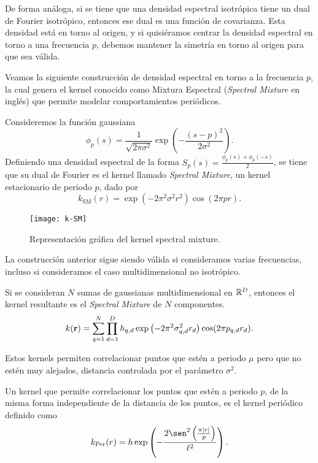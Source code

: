 De forma análoga, si se tiene que una densidad espectral isotrópica tiene un dual de Fourier isotrópico, entonces ese dual es una función de covarianza. Esta densidad está en torno al origen, y si quisiéramos centrar la densidad espectral en torno a una frecuencia \(p\), debemos mantener la simetría en torno al origen para que sea válida. 

Veamos la siguiente construcción de densidad espectral en torno a la frecuencia \(p\), la cual genera el kernel conocido como Mixtura Espectral (\emph{Spectral Mixture} en inglés) que permite modelar comportamientos periódicos.

\begin{proposition}
	Consideremos la función gaussiana
	\[\phi_{p}(s) = \frac{1}{\sqrt{2\pi \sigma^2}} \exp \left(-\frac{(s - p)^{2}}{2\sigma^{2}}\right).\] Definiendo una densidad espectral de la forma \(S_{p}(s) = \frac{\phi_{p}(s) + \phi_{p}(-s)}{2}\), se tiene que su dual de Fourier es el kernel llamado \emph{Spectral Mixture}, un kernel estacionario de periodo \(p\), dado por
	\[k_{\mathrm{SM}}(r) = \exp \left(-2\pi^{2} \sigma^2 r^{2}\right) \cos(2\pi pr).\]
\end{proposition}

\begin{figure}[h]
	\centering
	\texttt{[image: k-SM]}
	\caption{Representación gráfica del kernel spectral mixture.}
\end{figure}

La construcción anterior sigue siendo válida si consideramos varias frecuencias, incluso si consideramos el caso multidimensional no isotrópico.

\begin{proposition}
	Si se consideran \(N\) sumas de gaussianas multidimensional en \(\mathbb{R}^{D}\)\cite{wilson2013gaussian}, entonces el kernel resultante es el \emph{Spectral Mixture} de \(N\) componentes.
	\begin{equation*}
		k(\mathbf{r}) = \sum_{q=1}^{N} \prod_{d=1}^{D} h_{q, d} \exp\left(-2\pi^{2} \sigma_{q, d}^{2} r_{d}\right) \cos(2\pi p_{q,d} r_{d}).
	\end{equation*}
\end{proposition}

Estos kernels permiten correlacionar puntos que estén a periodo \(\mu\) pero que no estén muy alejados, distancia controlada por el parámetro \(\sigma^2\). 

Un kernel que permite correlacionar los puntos que estén a periodo \(p\), de la misma forma independiente de la distancia de los puntos, es el kernel periódico definido como
\[ k_{\mathrm{Per}}(r) = h \exp \left(-\frac{2 \sen^{2}\left(\frac{\pi \vert r\vert}{p}\right)}{\ell^2}\right).\]

